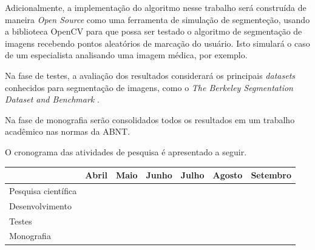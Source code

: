 Adicionalmente, a implementação do algoritmo nesse trabalho será
construída de maneira \textit{Open Source} como uma ferramenta de
simulação de segmenteção, usando a biblioteca \gls{OpenCV} para que possa
ser testado o algoritmo de segmentação de imagens recebendo pontos
aleatórios de marcação do usuário. Isto simulará o caso de um
especialista analisando uma imagem médica, por exemplo.


Na fase de testes, a avaliação dos resultados considerará os
principais \textit{datasets} conhecidos para segmentação de imagens,
como o \textit{The Berkeley Segmentation Dataset and Benchmark}
\cite{MartinFTM01}.

Na fase de monografia serão consolidados todos os resultados em um
trabalho acadêmico nas normas da \gls{ABNT}.

O cronograma das atividades de pesquisa é apresentado a seguir.

\begin{table}[h]
\begin{tabular}{l|l|l|l|l|l|l|}
\cline{2-7}
                                          & Abril                                         & Maio                                            & Junho                                           & Julho                                           & Agosto                                          & Setembro                                        \\ \hline
\multicolumn{1}{|l|}{Pesquisa científica} & \multicolumn{1}{c|}{\cellcolor[HTML]{000000}} & \cellcolor[HTML]{000000}{\color[HTML]{000000} } & \cellcolor[HTML]{000000}{\color[HTML]{000000} } &                                                 &                                                 &                                                 \\ \hline
\multicolumn{1}{|l|}{Desenvolvimento}     &                                               &                                                 & \cellcolor[HTML]{000000}{\color[HTML]{000000} } & \cellcolor[HTML]{000000}{\color[HTML]{000000} } &                                                 &                                                 \\ \hline
\multicolumn{1}{|l|}{Testes}              &                                               &                                                 &                                                 & \cellcolor[HTML]{000000}{\color[HTML]{000000} } & \cellcolor[HTML]{000000}{\color[HTML]{000000} } &                                                 \\ \hline
\multicolumn{1}{|l|}{Monografia}          &                                               &                                                 &                                                 &                                                 & \cellcolor[HTML]{000000}{\color[HTML]{000000} } & \cellcolor[HTML]{000000}{\color[HTML]{000000} } \\ \hline
\end{tabular}
\end{table}
